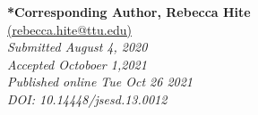 \documentclass[11.5pt]{sig-alternate} %
\begin{document}

\textbf{*Corresponding Author, Rebecca Hite}\\
\href{mailto: rebecca.hite@ttu.edu}{(rebecca.hite@ttu.edu)} \\
\textit{Submitted  August 4, 2020}\\
\textit{Accepted Octoboer 1,2021} \\
\textit{Published online Tue Oct 26 2021} \\
\textit{DOI: 10.14448/jsesd.13.0012} \\
\pagebreak
\pagebreak

\vspace{5mm}
\section*{\vspace{140mm}}
\end{document}
